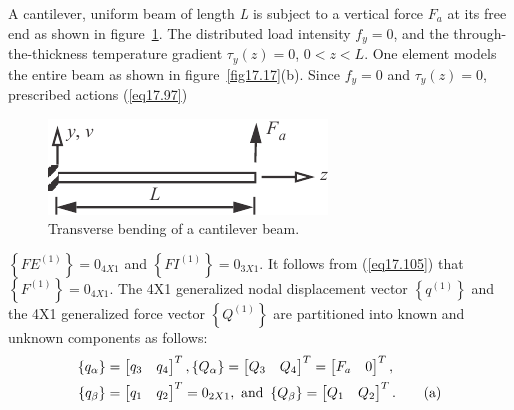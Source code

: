 \documentclass{AeroStructure-ERJohnson}
\begin{document}
\vspace*{-2\baselineskip}

\begin{example} \label{ex17.4}
A cantilever, uniform beam of length \textit{L} is subject to a vertical force $F_{a}$ at its free end as shown
 in figure~\ref{fig17.18}. The distributed load intensity $f_{y}=0$, and the through-the-thickness temperature gradient $\tau_{y}(z)=0$, $0<z<L$. One element  models the entire beam as shown in figure~\ref{fig17.17}(b). Since $f_{y}=0$ and $\tau_{y}(z)=0$, prescribed actions (\ref{eq17.97})\begin{figure}
\vspace{-6pt}
\includegraphics{Figure_17-18.pdf}
\caption{Transverse bending of a cantilever beam.\label{fig17.18}}
\end{figure} $\left\{F E^{(1)}\right\}=0_{4 X 1}$ and $\left\{F I^{(1)}\right\}=0_{3 X 1}$. It follows from (\ref{eq17.105}) that $\left\{F^{(1)}\right\}=0_{4 X 1}$. The 4X1 generalized nodal displacement vector $\left\{q^{(1)}\right\}$ and the 4X1 generalized force vector $\left\{Q^{(1)}\right\}$ are partitioned into known and unknown components as follows:\vspace*{-8pt}
\begin{align}
\left\{q_{\alpha}\right\} &=\left[\begin{array}{@{}ll@{}}q_{3} & q_{4}\end{array}\right]^{T}, \left\{Q_{\alpha}\right\}=\left[\begin{array}{@{}ll@{}}Q_{3} & Q_{4}\end{array}\right]^{T}=\left[\begin{array}{@{}ll@{}}F_{a} & 0\end{array}\right]^{T},\nonumber\\
\left\{q_{\beta}\right\} &=\left[\begin{array}{@{}ll@{}}q_{1} & q_{2}\end{array}\right]^{T}=0_{2 X 1}, \textrm{ and } \left\{Q_{\beta}\right\}=\left[\begin{array}{@{}ll@{}}Q_{1} & Q_{2}\end{array}\right]^{T}. \label{eq17.4.a}\tag{a}
\end{align}


\end{example}
\end{document}
